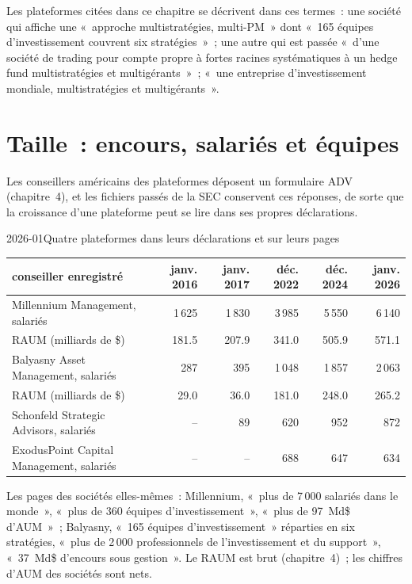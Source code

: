 Les plateformes citées dans ce chapitre se décrivent dans ces termes~: une société qui affiche une «~approche multistratégies, multi-PM~»
dont «~165 équipes d'investissement couvrent six stratégies~»~; une autre qui est passée «~d'une société de trading pour compte propre à fortes racines systématiques
à un hedge fund multistratégies et multigérants~»~; «~une entreprise
d'investissement mondiale, multistratégies et multigérants~».

\section{Taille~: encours, salariés et équipes}

Les conseillers américains des plateformes déposent un formulaire ADV (chapitre~4), et les fichiers passés de la SEC conservent ces réponses, de sorte que la croissance d'une plateforme
peut se lire dans ses propres déclarations.

\begin{dated}{2026-01}{Quatre plateformes dans leurs déclarations et sur leurs pages}\label{dat:in:multi-manager-platforms:size}
\footnotesize
\begin{tabular}{@{}lrrrrr@{}}
\toprule
conseiller enregistré & janv. 2016 & janv. 2017 & déc. 2022 & déc. 2024 & janv. 2026\\
\midrule
Millennium Management, salariés & 1\,625 & 1\,830 & 3\,985 & 5\,550 & 6\,140\\
\quad RAUM (milliards de \$) & 181.5 & 207.9 & 341.0 & 505.9 & 571.1\\
Balyasny Asset Management, salariés & 287 & 395 & 1\,048 & 1\,857 & 2\,063\\
\quad RAUM (milliards de \$) & 29.0 & 36.0 & 181.0 & 248.0 & 265.2\\
Schonfeld Strategic Advisors, salariés & -- & 89 & 620 & 952 & 872\\
ExodusPoint Capital Management, salariés & -- & -- & 688 & 647 & 634\\
\bottomrule
\end{tabular}

\smallskip\noindent Les pages des sociétés elles-mêmes~: Millennium, «~plus de 7\,000 salariés dans le monde~», «~plus de 360 équipes d'investissement~», «~plus de 97~Md\$
d'AUM~»~; Balyasny, «~165 équipes d'investissement~» réparties en six stratégies, «~plus de 2\,000 professionnels de l'investissement et du support~»,
«~37~Md\$ d'encours sous gestion~». Le RAUM est brut (chapitre~4)~; les chiffres d'AUM des sociétés sont nets.
\end{dated}

